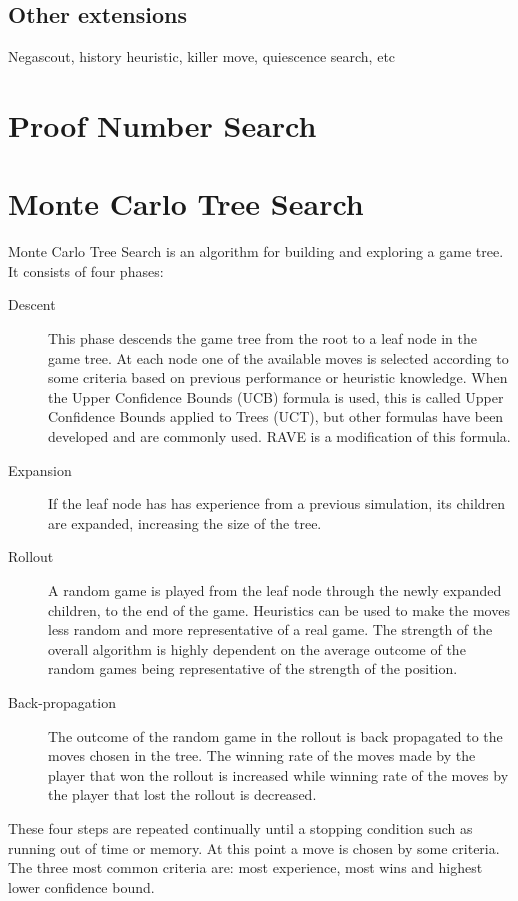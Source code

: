 \subsection{Other extensions}

Negascout, history heuristic, killer move, quiescence search, etc



\section{Proof Number Search}




\section{Monte Carlo Tree Search}

Monte Carlo Tree Search is an algorithm for building and exploring a game tree. It consists of four phases:
\begin{description}
\item[Descent] This phase descends the game tree from the root to a leaf node in the game tree. At each node one of the available moves is selected according to some criteria based on previous performance or heuristic knowledge. When the Upper Confidence Bounds (UCB) formula is used, this is called Upper Confidence Bounds applied to Trees (UCT), but other formulas have been developed and are commonly used. RAVE is a modification of this formula.
\item[Expansion] If the leaf node has has experience from a previous simulation, its children are expanded, increasing the size of the tree.
\item[Rollout] A random game is played from the leaf node through the newly expanded children, to the end of the game. Heuristics can be used to make the moves less random and more representative of a real game. The strength of the overall algorithm is highly dependent on the average outcome of the random games being representative of the strength of the position.
\item[Back-propagation] The outcome of the random game in the rollout is back propagated to the moves chosen in the tree. The winning rate of the moves made by the player that won the rollout is increased while winning rate of the moves by the player that lost the rollout is decreased.
\end{description}

These four steps are repeated continually until a stopping condition such as running out of time or memory. At this point a move is chosen by some criteria. The three most common criteria are: most experience, most wins and highest lower confidence bound.

